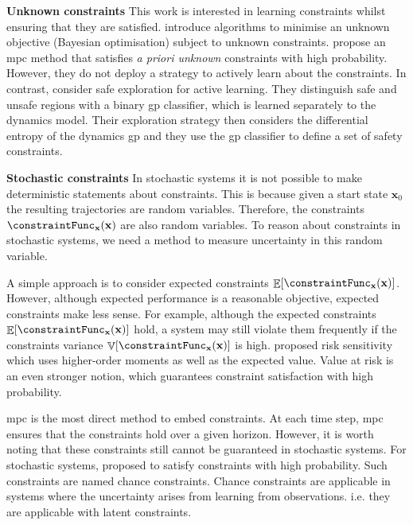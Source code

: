 \documentclass{mimosis-class/mimosis}
\numberwithin{equation}{chapter}
\DeclareMathOperator{\E}{\mathbb{E}}
\DeclareMathOperator{\V}{\mathbb{V}}
\newcommand{\state}{\ensuremath{\mathbf{x}}}
\begin{document}
\textbf{Unknown constraints}
This work is interested in learning constraints whilst ensuring that they are satisfied.
\cite{ariafarADMMBO2019,gelbartBayesian2014} introduce algorithms to minimise an unknown objective
(Bayesian optimisation) subject to unknown constraints.
\cite{sadighSafe2016} propose an \acrshort{mpc} method that satisfies \emph{a priori unknown} constraints with high probability.
However, they do not deploy a strategy to actively learn about the constraints.
In contrast, \cite{schreiterSafe2015} consider safe exploration for active learning.
They distinguish safe and unsafe regions with a binary \acrshort{gp} classifier, which is
learned separately to the dynamics model. Their exploration strategy then considers
the differential entropy of the dynamics \acrshort{gp} and they use the \acrshort{gp} classifier to define
a set of safety constraints.

\textbf{Stochastic constraints}
In stochastic systems it is not possible to make deterministic statements about constraints.
This is because given a start state \(\state_0\) the resulting trajectories are random variables.
Therefore, the constraints \(\constraintFunc_{\state}(\state)\) are also random variables.
To reason about constraints in stochastic systems, we need a method to measure uncertainty in this
random variable.

A simple approach is to consider expected constraints \(\E[\constraintFunc_{\state}(\state)]\).
However, although expected performance is a reasonable objective, expected constraints make less sense.
For example, although the expected constraints \(\E[\constraintFunc_{\state}(\state)]\) hold, a system may
still violate them frequently if the constraints variance \(\V[\constraintFunc_{\state}(\state)]\) is high.
\cite{ferberGames1958} proposed risk sensitivity which uses higher-order moments as well as the expected value.
Value at risk \citep{duffieOverview1997a} is an even stronger notion, which guarantees constraint satisfaction
with high probability.

\acrshort{mpc} \citep{eduardof.Model2007} is the most direct method to embed constraints.
At each time step, \acrshort{mpc} ensures that the constraints hold over a given horizon.
However, it is worth noting that these constraints still cannot be guaranteed in stochastic systems.
For stochastic systems, \cite{schwarmChanceconstrained1999} proposed to satisfy constraints with high probability.
Such constraints are named chance constraints.
Chance constraints are applicable in systems where the uncertainty arises from learning from observations.
i.e. they are applicable with latent constraints.
\end{document}
